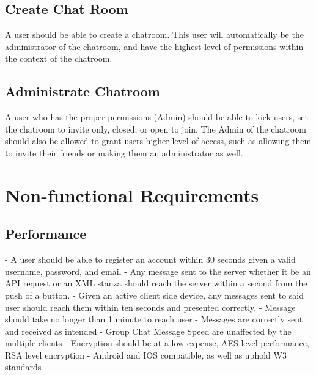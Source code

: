 \documentclass[11pt]{article}
\theoremstyle{plain}
\theoremstyle{definition}
\begin{document}
\subsection{Create Chat Room}
A user should be able to create a chatroom. This user will automatically be the administrator of the chatroom, and have the highest level of permissions within the context of the chatroom.
\subsection{Administrate Chatroom}
A user who has the proper permissions (Admin) should be able to kick users, set the chatroom to invite only, closed, or open to join. The Admin of the chatroom should also be allowed to grant users higher level of access, such as allowing them to invite their friends or making them an administrator as well.

\section{Non-functional Requirements}\label{sec:nonfuncrequirements}
\subsection{Performance}
- A user should be able to register an account within 30 seconds given a valid username, 
  password, and email
\newline
- Any message sent to the server whether it be an API request or an XML stanza should reach 
  the server within a second from the push of a button.
\newline
- Given an active client side device, any messages sent to said user should reach them 
  within ten seconds and presented correctly. \newline
- Message should take no longer than 1 minute to reach user \newline
- Messages are correctly sent and received as intended \newline
- Group Chat Message Speed are unaffected by the multiple clients \newline
- Encryption should be at a low expense, AES level performance, RSA level encryption \newline
- Android and IOS compatible, as well as uphold W3 standards
\end{document}
